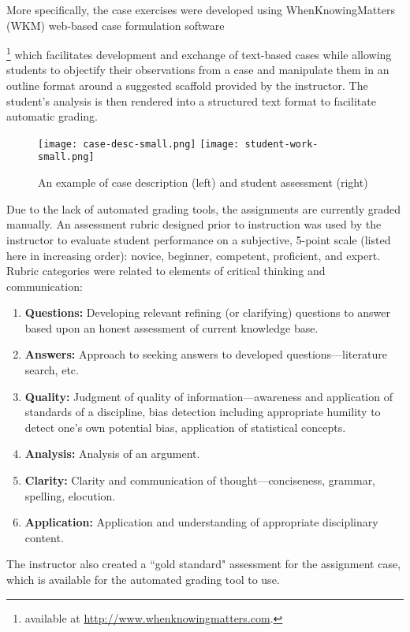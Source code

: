More specifically, the case exercises were developed using
WhenKnowingMatters (WKM) web-based case formulation
software{\footnote{available at \url{http://www.whenknowingmatters.com}.}
which facilitates development and exchange of text-based cases while
allowing students to objectify their observations from a case and
manipulate them in an outline format around a suggested scaffold provided
by the instructor. The student's analysis is then rendered into a
structured text format to facilitate automatic grading.

\begin{figure*}[ht]
\texttt{[image: case-desc-small.png]}
\texttt{[image: student-work-small.png]}
\caption{An example of case description (left) and student assessment (right)}
\label{fig:example}
\end{figure*}

Due to the lack of automated grading tools, the assignments are currently
graded manually. An assessment rubric designed prior to instruction was
used by the instructor to evaluate student performance on a subjective,
5-point scale (listed here in increasing order): novice, beginner,
competent, proficient, and expert. Rubric categories were related to
elements of critical thinking and communication:
\begin{enumerate}
\item {\bf Questions:} Developing relevant refining (or clarifying)
 questions to answer based upon an honest assessment of current knowledge
 base.
\item {\bf Answers:} Approach to seeking answers to developed
 questions---literature search, etc.
\item {\bf Quality:} Judgment of quality of information---awareness and
 application of standards of a discipline, bias detection including
 appropriate humility to detect one’s own potential bias, application of
 statistical concepts.
\item {\bf Analysis:} Analysis of an argument.
\item  {\bf Clarity:} Clarity and communication of thought---conciseness,
 grammar, spelling, elocution.
\item {\bf Application:} Application and understanding of appropriate
 disciplinary content.
\end{enumerate}

The instructor also created a ``gold standard" assessment for the
assignment case, which is available for the automated grading tool to use.

}
